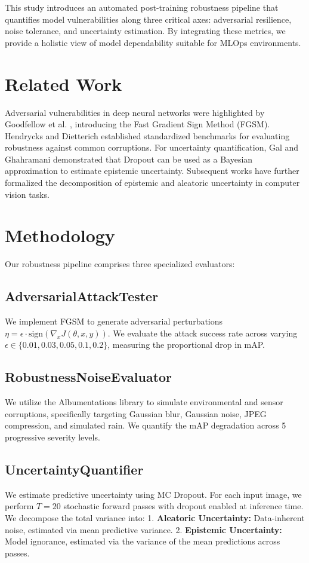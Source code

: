 \documentclass[conference]{IEEEtran}
\begin{document}
This study introduces an automated post-training robustness pipeline that quantifies model vulnerabilities along three critical axes: adversarial resilience, noise tolerance, and uncertainty estimation. By integrating these metrics, we provide a holistic view of model dependability suitable for MLOps environments.

\section{Related Work}
Adversarial vulnerabilities in deep neural networks were highlighted by Goodfellow et al. \cite{goodfellow2015fgsm}, introducing the Fast Gradient Sign Method (FGSM). Hendrycks and Dietterich \cite{hendrycks2019benchmarking} established standardized benchmarks for evaluating robustness against common corruptions. For uncertainty quantification, Gal and Ghahramani \cite{gal2016dropout} demonstrated that Dropout can be used as a Bayesian approximation to estimate epistemic uncertainty. Subsequent works \cite{kendall2017uncertainties, lakshminarayanan2017simple} have further formalized the decomposition of epistemic and aleatoric uncertainty in computer vision tasks.

\section{Methodology}
Our robustness pipeline comprises three specialized evaluators:

\subsection{AdversarialAttackTester}
We implement FGSM to generate adversarial perturbations $\eta = \epsilon \cdot \text{sign}(\nabla_x J(\theta, x, y))$. We evaluate the attack success rate across varying $\epsilon \in \{0.01, 0.03, 0.05, 0.1, 0.2\}$, measuring the proportional drop in mAP.

\subsection{RobustnessNoiseEvaluator}
We utilize the Albumentations library to simulate environmental and sensor corruptions, specifically targeting Gaussian blur, Gaussian noise, JPEG compression, and simulated rain. We quantify the mAP degradation across 5 progressive severity levels.

\subsection{UncertaintyQuantifier}
We estimate predictive uncertainty using MC Dropout. For each input image, we perform $T=20$ stochastic forward passes with dropout enabled at inference time. We decompose the total variance into:
1. \textbf{Aleatoric Uncertainty:} Data-inherent noise, estimated via mean predictive variance.
2. \textbf{Epistemic Uncertainty:} Model ignorance, estimated via the variance of the mean predictions across passes.
\end{document}

